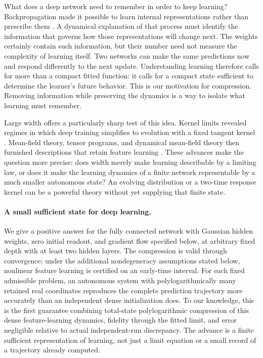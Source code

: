 \documentclass[11pt]{article}
\theoremstyle{definition}
\theoremstyle{remark}
\begin{document}
What does a deep network need to remember in order to keep learning?
Backpropagation made it possible to learn internal representations rather than
prescribe them \cite{rumelhart1986learning}. A dynamical explanation of that
process must identify the information that governs how those representations
will change next. The weights certainly contain such information, but their
number need not measure the complexity of learning itself. Two networks can
make the same predictions now and respond differently to the next update.
Understanding learning therefore calls for more than a compact fitted
function: it calls for a compact state sufficient to determine the learner's
future behavior. This is our motivation for compression. Removing information
while preserving the dynamics is a way to isolate what learning must remember.

Large width offers a particularly sharp test of this idea. Kernel limits
revealed regimes in which deep training simplifies to evolution with a fixed
tangent kernel \cite{jacot2018ntk,lee2019wide}. Mean-field theory, tensor programs,
and dynamical mean-field theory then furnished descriptions that retain
feature learning \cite{nguyen2023rigorous,yang2021tensor,bordelon2022dmft}.
These advances make the question more precise: does width merely make
learning describable by a limiting law, or does it make the learning dynamics
of a finite network representable by a much smaller autonomous state?
An evolving distribution or a two-time response kernel can be a powerful
theory without yet supplying that finite state.

\paragraph{A small sufficient state for deep learning.}
We give a positive answer for the fully connected network with Gaussian
hidden weights, zero initial readout, and gradient flow specified below, at
arbitrary fixed depth with at least two hidden layers. The compression is
valid through convergence; under the additional nondegeneracy assumptions
stated below, nonlinear feature learning is certified on an early-time interval.
For each fixed admissible problem, an autonomous
system with polylogarithmically many retained real coordinates
reproduces the complete prediction trajectory more accurately than an
independent dense initialization does. To our knowledge, this is the first
guarantee combining total-state polylogarithmic compression of this dense
feature-learning dynamics, fidelity through the fitted limit, and error
negligible relative to actual independent-run discrepancy.
The advance is a finite sufficient representation of learning, not just a
limit equation or a small record of a trajectory already computed.
\end{document}

